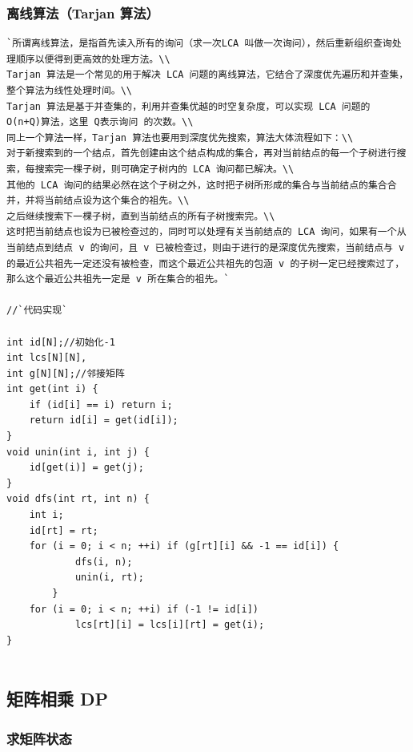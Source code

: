 \documentclass[a4paper]{article}
\begin{document}
\begin{CJK*}{UTF8}{gbsn}
\begin{multicols}{3}
\begin{flushleft}
\subsubsection{离线算法（Tarjan 算法）}
\begin{lstlisting}
`所谓离线算法，是指首先读入所有的询问（求一次LCA 叫做一次询问），然后重新组织查询处理顺序以便得到更高效的处理方法。\\
Tarjan 算法是一个常见的用于解决 LCA 问题的离线算法，它结合了深度优先遍历和并查集，整个算法为线性处理时间。\\
Tarjan 算法是基于并查集的，利用并查集优越的时空复杂度，可以实现 LCA 问题的 O(n+Q)算法，这里 Q表示询问 的次数。\\
同上一个算法一样，Tarjan 算法也要用到深度优先搜索，算法大体流程如下：\\
对于新搜索到的一个结点，首先创建由这个结点构成的集合，再对当前结点的每一个子树进行搜索，每搜索完一棵子树，则可确定子树内的 LCA 询问都已解决。\\
其他的 LCA 询问的结果必然在这个子树之外，这时把子树所形成的集合与当前结点的集合合并，并将当前结点设为这个集合的祖先。\\
之后继续搜索下一棵子树，直到当前结点的所有子树搜索完。\\
这时把当前结点也设为已被检查过的，同时可以处理有关当前结点的 LCA 询问，如果有一个从当前结点到结点 v 的询问，且 v 已被检查过，则由于进行的是深度优先搜索，当前结点与 v 的最近公共祖先一定还没有被检查，而这个最近公共祖先的包涵 v 的子树一定已经搜索过了，那么这个最近公共祖先一定是 v 所在集合的祖先。`

//`代码实现`

int id[N];//初始化-1
int lcs[N][N],
int g[N][N];//邻接矩阵
int get(int i) {
    if (id[i] == i) return i;
    return id[i] = get(id[i]);
}
void unin(int i, int j) {
    id[get(i)] = get(j);
}
void dfs(int rt, int n) {
    int i;
    id[rt] = rt;
    for (i = 0; i < n; ++i) if (g[rt][i] && -1 == id[i]) {
            dfs(i, n);
            unin(i, rt);
        }
    for (i = 0; i < n; ++i) if (-1 != id[i])
            lcs[rt][i] = lcs[i][rt] = get(i);
}
 
\end{lstlisting}

\subsection{矩阵相乘 DP}

\subsubsection{求矩阵状态}
\begin{lstlisting}


\end{lstlisting}
\end{flushleft}
\end{multicols}
\end{CJK*}
\end{document}
